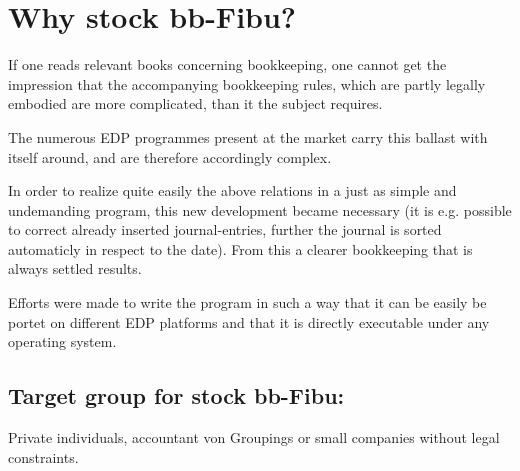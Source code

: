 \section{ Why stock bb-Fibu?}

 If one reads relevant books concerning bookkeeping, one cannot get
the impression that the accompanying bookkeeping rules, which are
partly legally embodied are more complicated, than it the subject requires.

 The numerous EDP programmes present at the market carry this ballast with
itself around, and are therefore accordingly complex.

  In order to realize quite easily the above relations in a just as simple
and undemanding program, this new development became necessary (it is e.g.
possible to correct already inserted  journal-entries, further the journal is
sorted automaticly in respect to the date).  From this a  clearer
bookkeeping that is always settled results.

 Efforts were made to write the program in such a way that it can be
easily be portet on different EDP platforms and that it is directly executable
under any operating system.



\subsection{ Target group for stock bb-Fibu:}

 Private individuals, accountant von Groupings or small companies without
legal constraints.


